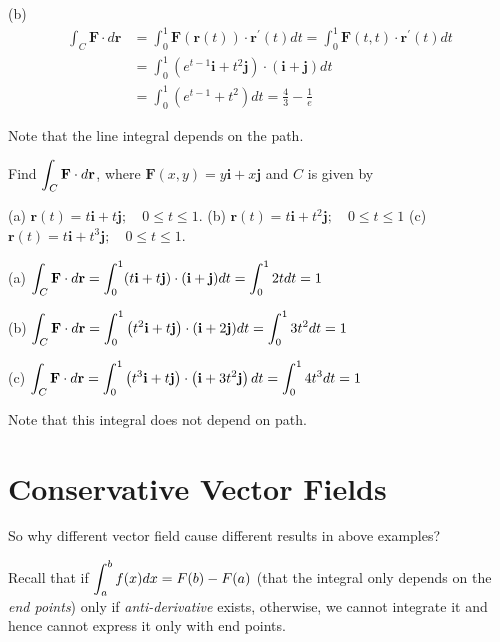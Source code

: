 \begin{spacing}{1.3}
    (b)
    $$\begin{aligned}
    \int_{C} \mathbf{F} \cdot d \mathbf{r} &=\int_{0}^{1} \mathbf{F}(\mathbf{r}(t)) \cdot \mathbf{r}^{\prime}(t) d t=\int_{0}^{1} \mathbf{F}(t, t) \cdot \mathbf{r}^{\prime}(t) d t \\
    &=\int_{0}^{1}\left(e^{t-1} \mathbf{i}+t^{2} \mathbf{j}\right) \cdot(\mathbf{i}+\mathbf{j}) d t \\
    &=\int_{0}^{1}\left(e^{t-1}+t^{2}\right) d t =\frac{4}{3}-\frac{1}{e}
    \end{aligned}$$

    {\blue Note that the line integral depends on the path.}
    
    \vspace{0.2in}
    \eg Find $\displaystyle \int_{C} \mathbf{F} \cdot d \mathbf{r}$, where $\mathbf{F}(x, y)=y \mathbf{i}+x \mathbf{j}$ and $C$ is given by
    
    (a) $\mathbf{r}(t)=t \mathbf{i}+t \mathbf{j} ; \quad 0 \leqslant t \leqslant 1$.\hspace{0.2in}
    (b) $\mathbf{r}(t)=t \mathbf{i}+t^{2} \mathbf{j} ; \quad 0 \leqslant t \leqslant 1$\hspace{0.2in}
    (c) $\mathbf{r}(t)=t \mathbf{i}+t^{3} \mathbf{j} ; \quad 0 \leqslant t \leqslant 1$.

    \sol

    (a) $\displaystyle \int_{C} \mathbf{F} \cdot d \mathbf{r}=\int_{0}^{1}(t \mathbf{i}+t \mathbf{j}) \cdot(\mathbf{i}+\mathbf{j}) d t=\int_{0}^{1} 2 t d t=1$
    
    (b) $\displaystyle \int_{C} \mathbf{F} \cdot d \mathbf{r}=\int_{0}^{1}\left(t^{2} \mathbf{i}+t \mathbf{j}\right) \cdot(\mathbf{i}+2 \mathbf{j}) d t=\int_{0}^{1} 3 t^{2} d t=1$
    
    (c) $\displaystyle \int_{C} \mathbf{F} \cdot d \mathbf{r}=\int_{0}^{1}\left(t^{3} \mathbf{i}+t \mathbf{j}\right) \cdot\left(\mathbf{i}+3 t^{2} \mathbf{j}\right) d t=\int_{0}^{1} 4 t^{3} d t=1$

    {\blue Note that this integral does not depend on path.}

    \newpage
    \section{Conservative Vector Fields}

    {\blue So why different vector field cause different results in above examples?}
    
    Recall that if $\displaystyle \int_a^b f(x) dx=F(b)-F(a)$ (that the integral only depends on the 
    {\it end points}) only if {\it anti-derivative } exists, otherwise, we cannot integrate it
    and hence cannot express it only with end points.


\end{spacing}
